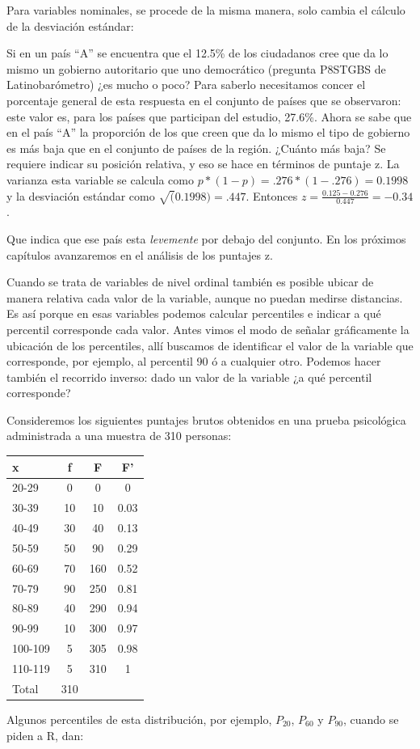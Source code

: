 \documentclass[]{book}
\begin{document}
Para variables nominales, se procede de la misma manera, solo cambia el cálculo de la desviación estándar:

Si en un país ``A'' se encuentra que el 12.5\% de los ciudadanos cree que da lo mismo un gobierno autoritario que uno democrático (pregunta P8STGBS de Latinobarómetro) ¿es mucho o poco? Para saberlo necesitamos concer el porcentaje general de esta respuesta en el conjunto de países que se observaron: este valor es, para los países que participan del estudio, 27.6\%. Ahora se sabe que en el país ``A'' la proporción de los que creen que da lo mismo el tipo de gobierno es más baja que en el conjunto de países de la región. ¿Cuánto más baja? Se requiere indicar su posición relativa, y eso se hace en términos de puntaje z. La varianza esta variable se calcula como \(p*(1-p)=.276*(1-.276)=0.1998\) y la desviación estándar como \(\sqrt(0.1998)=.447\). Entonces \(z = \frac{0.125-0.276}{0.447}=-0.34\).

Que indica que ese país esta \emph{levemente} por debajo del conjunto. En los próximos capítulos avanzaremos en el análisis de los puntajes z.

Cuando se trata de variables de nivel ordinal también es posible ubicar de manera relativa cada valor de la variable, aunque no puedan medirse distancias. Es así porque en esas variables podemos calcular percentiles e indicar a qué percentil corresponde cada valor. Antes vimos el modo de señalar gráficamente la ubicación de los percentiles, allí buscamos de identificar el valor de la variable que corresponde, por ejemplo, al percentil 90 ó a cualquier otro. Podemos hacer también el recorrido inverso: dado un valor de la variable ¿a qué percentil corresponde?

Consideremos los siguientes puntajes brutos obtenidos en una prueba
psicológica administrada a una muestra de 310 personas:

\begin{longtable}[]{@{}lccc@{}}
\toprule
x & f & F & F'\tabularnewline
\midrule
\endhead
20-29 & 0 & 0 & 0\tabularnewline
30-39 & 10 & 10 & 0.03\tabularnewline
40-49 & 30 & 40 & 0.13\tabularnewline
50-59 & 50 & 90 & 0.29\tabularnewline
60-69 & 70 & 160 & 0.52\tabularnewline
70-79 & 90 & 250 & 0.81\tabularnewline
80-89 & 40 & 290 & 0.94\tabularnewline
90-99 & 10 & 300 & 0.97\tabularnewline
100-109 & 5 & 305 & 0.98\tabularnewline
110-119 & 5 & 310 & 1\tabularnewline
Total & 310 & &\tabularnewline
\bottomrule
\end{longtable}

Algunos percentiles de esta distribución, por ejemplo, \(P_{20}\), \(P_{60}\) y \(P_{90}\), cuando se piden a R, dan:
\end{document}
